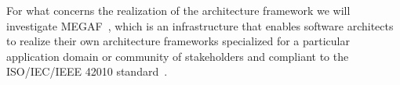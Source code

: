 For what concerns the realization of the architecture framework we will investigate MEGAF~\cite{MEGAF2010,MEGAF2012}, 
%
%
which is an infrastructure that enables software architects to realize their
own architecture frameworks specialized for a particular
application domain or community of stakeholders and compliant to the ISO/IEC/IEEE 42010 standard~\cite{42010}. 
